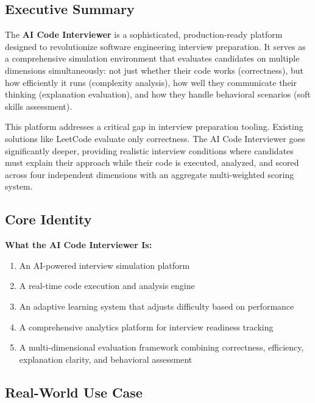 \documentclass[12pt,a4paper,oneside]{article}
\begin{document}
\subsection{Executive Summary}

The \textbf{AI Code Interviewer} is a sophisticated, production-ready platform designed to revolutionize software engineering interview preparation. It serves as a comprehensive simulation environment that evaluates candidates on multiple dimensions simultaneously: not just whether their code works (correctness), but how efficiently it runs (complexity analysis), how well they communicate their thinking (explanation evaluation), and how they handle behavioral scenarios (soft skills assessment).

This platform addresses a critical gap in interview preparation tooling. Existing solutions like LeetCode evaluate only correctness. The AI Code Interviewer goes significantly deeper, providing realistic interview conditions where candidates must explain their approach while their code is executed, analyzed, and scored across four independent dimensions with an aggregate multi-weighted scoring system.

\subsection{Core Identity}

\begin{importantbox}
\textbf{What the AI Code Interviewer Is:}
\begin{enumerate}
    \item An AI-powered interview simulation platform
    \item A real-time code execution and analysis engine
    \item An adaptive learning system that adjusts difficulty based on performance
    \item A comprehensive analytics platform for interview readiness tracking
    \item A multi-dimensional evaluation framework combining correctness, efficiency, explanation clarity, and behavioral assessment
\end{enumerate}
\end{importantbox}

\subsection{Real-World Use Case}
\end{document}
